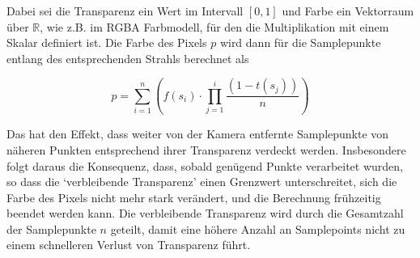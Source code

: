 \documentclass[a4paper,fontsize=12pt,toc=bib,halfparskip]{scrartcl}
\begin{document}
Dabei sei die Transparenz ein Wert im Intervall $[0,1]$ und Farbe ein Vektorraum \"uber $\mathbb{R}$, wie z.B. im RGBA Farbmodell, f\"ur den die Multiplikation mit einem Skalar definiert ist. Die Farbe des Pixels $p$ wird dann f\"ur die Samplepunkte entlang des entsprechenden Strahls berechnet als

\begin{equation}
	p = \sum_{i=1}^{n} \left(f(s_i) \cdot \prod_{j=1}^{i} \frac{(1-t(s_j))}{n}\right)
	\label{RaycastingFormula}
\end{equation}

Das hat den Effekt, dass weiter von der Kamera entfernte Samplepunkte von n\"aheren Punkten entsprechend ihrer Transparenz verdeckt werden. Insbesondere folgt daraus die Konsequenz, dass, sobald gen\"ugend Punkte verarbeitet wurden, so dass die `verbleibende Transparenz' einen Grenzwert unterschreitet, sich die Farbe des Pixels nicht mehr stark ver\"andert, und die Berechnung fr\"uhzeitig beendet werden kann. Die verbleibende Transparenz wird durch die Gesamtzahl der Samplepunkte $n$ geteilt, damit eine h\"ohere Anzahl an Samplepoints nicht zu einem schnelleren Verlust von Transparenz f\"uhrt.
\end{document}
